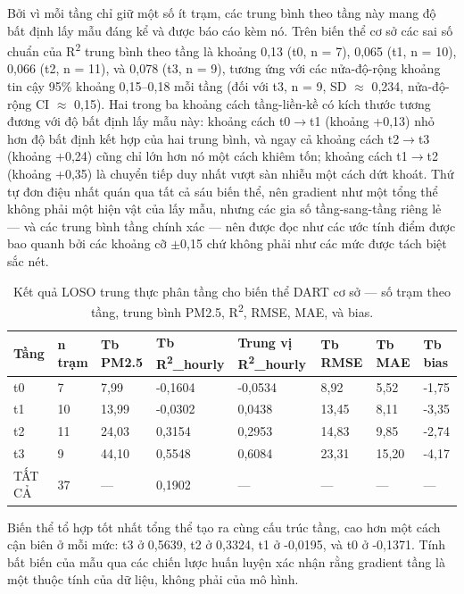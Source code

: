 Bởi vì mỗi tầng chỉ giữ một số ít trạm, các trung bình theo tầng này mang độ bất định lấy mẫu đáng kể và được báo cáo kèm nó. Trên biến thể cơ sở các sai số chuẩn của R\textsuperscript{2} trung bình theo tầng là khoảng 0,13 (t0, n = 7), 0,065 (t1, n = 10), 0,066 (t2, n = 11), và 0,078 (t3, n = 9), tương ứng với các nửa-độ-rộng khoảng tin cậy 95\% khoảng 0,15--0,18 mỗi tầng (đối với t3, n = 9, SD $\approx$ 0,234, nửa-độ-rộng CI $\approx$ 0,15). Hai trong ba khoảng cách tầng-liền-kề có kích thước tương đương với độ bất định lấy mẫu này: khoảng cách t0$\rightarrow$t1 (khoảng +0,13) nhỏ hơn độ bất định kết hợp của hai trung bình, và ngay cả khoảng cách t2$\rightarrow$t3 (khoảng +0,24) cũng chỉ lớn hơn nó một cách khiêm tốn; khoảng cách t1$\rightarrow$t2 (khoảng +0,35) là chuyển tiếp duy nhất vượt sàn nhiễu một cách dứt khoát. Thứ tự đơn điệu nhất quán qua tất cả sáu biến thể, nên gradient như một tổng thể không phải một hiện vật của lấy mẫu, nhưng các gia số tầng-sang-tầng riêng lẻ --- và các trung bình tầng chính xác --- nên được đọc như các ước tính điểm được bao quanh bởi các khoảng cỡ $\pm$0,15 chứ không phải như các mức được tách biệt sắc nét.

{\small
\begin{longtable}{llllllll}
\caption{Kết quả LOSO trung thực phân tầng cho biến thể DART cơ sở --- số trạm theo tầng, trung bình PM2.5, R\textsuperscript{2}, RMSE, MAE, và bias.}\\
\toprule
\textbf{Tầng} & \textbf{n trạm} & \textbf{Tb PM2.5} & \textbf{Tb R\textsuperscript{2}\_hourly} & \textbf{Trung vị R\textsuperscript{2}\_hourly} & \textbf{Tb RMSE} & \textbf{Tb MAE} & \textbf{Tb bias} \\
\midrule\endhead
t0 & 7 & 7,99 & -0,1604 & -0,0534 & 8,92 & 5,52 & -1,75 \\
t1 & 10 & 13,99 & -0,0302 & 0,0438 & 13,45 & 8,11 & -3,35 \\
t2 & 11 & 24,03 & 0,3154 & 0,2953 & 14,83 & 9,85 & -2,74 \\
t3 & 9 & 44,10 & 0,5548 & 0,6084 & 23,31 & 15,20 & -4,17 \\
TẤT CẢ & 37 & --- & 0,1902 & --- & --- & --- & --- \\
\bottomrule
\end{longtable}
}


Biến thể tổ hợp tốt nhất tổng thể tạo ra cùng cấu trúc tầng, cao hơn một cách cận biên ở mỗi mức: t3 ở 0,5639, t2 ở 0,3324, t1 ở -0,0195, và t0 ở -0,1371. Tính bất biến của mẫu qua các chiến lược huấn luyện xác nhận rằng gradient tầng là một thuộc tính của dữ liệu, không phải của mô hình.

